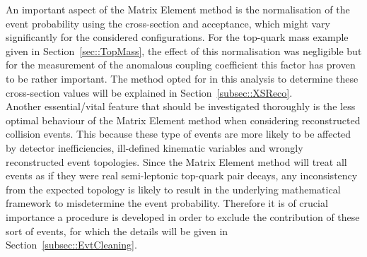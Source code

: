 
An important aspect of the Matrix Element method is the normalisation of the event probability using the cross-section and acceptance, which might vary significantly for the considered configurations. For the top-quark mass example given in Section~\ref{sec::TopMass}, the effect of this normalisation was negligible but for the measurement of the anomalous coupling coefficient this factor has proven to be rather important. The method opted for in this analysis to determine these cross-section values will be explained in Section~\ref{subsec::XSReco}.
\\

Another essential/vital feature that should be investigated thoroughly is the less optimal behaviour of the Matrix Element method when considering reconstructed collision events.
This because these type of events are more likely to be affected by detector inefficiencies, ill-defined kinematic variables and wrongly reconstructed event topologies.
Since the Matrix Element method will treat all events as if they were real semi-leptonic top-quark pair decays, any inconsistency from the expected topology is likely to result in the underlying mathematical framework to misdetermine the event probability.
Therefore it is of crucial importance a procedure is developed in order to exclude the contribution of these sort of events, for which the details will be given in Section~\ref{subsec::EvtCleaning}.


